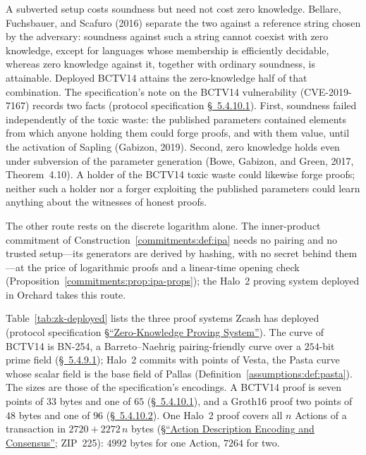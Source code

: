 \documentclass[11pt,a4paper]{article}
\theoremstyle{definition}
\theoremstyle{remark}
\begin{document}
A subverted setup costs soundness but need not cost zero knowledge.
Bellare, Fuchsbauer, and Scafuro (2016) separate the two against a
reference string chosen by the adversary: soundness against such a string
cannot coexist with zero knowledge, except for languages whose membership
is efficiently decidable, whereas zero knowledge against it, together with
ordinary soundness, is attainable. Deployed BCTV14 attains the
zero-knowledge half of that combination. The specification's note on
the BCTV14 vulnerability (CVE-2019-7167) records two facts (protocol
specification
\href{https://zips.z.cash/protocol/protocol.pdf\#bctv}{\S~5.4.10.1}).
First, soundness failed independently of the toxic waste: the
published parameters contained elements from which anyone holding
them could forge proofs, and with them value, until the activation of
Sapling (Gabizon, 2019). Second, zero knowledge holds even under
subversion of the parameter generation (Bowe, Gabizon, and Green,
2017, Theorem~4.10). A holder of the BCTV14 toxic waste could
likewise forge proofs; neither such a holder nor a forger exploiting
the published parameters could learn anything about the witnesses of
honest proofs.

The other route rests on the discrete logarithm alone. The
inner-product commitment of Construction~\ref{commitments:def:ipa}
needs no pairing and no trusted setup---its generators are derived by
hashing, with no secret behind them---at the price of logarithmic
proofs and a linear-time opening check
(Proposition~\ref{commitments:prop:ipa-props}); the Halo~2 proving
system deployed in Orchard takes this route.

Table~\ref{tab:zk-deployed} lists the three proof systems Zcash has
deployed (protocol specification
\href{https://zips.z.cash/protocol/protocol.pdf\#abstractzk}{\S``Zero-Knowledge
Proving System''}). The curve of BCTV14 is BN-254, a Barreto--Naehrig
pairing-friendly curve over a \(254\)-bit prime field
(\href{https://zips.z.cash/protocol/protocol.pdf\#bnpairing}{\S~5.4.9.1});
Halo~2 commits with points of Vesta, the Pasta curve whose scalar field
is the base field of Pallas (Definition~\ref{assumptions:def:pasta}).
The sizes are those of the specification's encodings. A BCTV14 proof is
seven points of \(33\) bytes and one of \(65\)
(\href{https://zips.z.cash/protocol/protocol.pdf\#bctvencoding}{\S~5.4.10.1}),
and a Groth16 proof two points of \(48\) bytes and one of \(96\)
(\href{https://zips.z.cash/protocol/protocol.pdf\#grothencoding}{\S~5.4.10.2}).
One Halo~2 proof covers all \(n\) Actions of a transaction in
\(2720 + 2272\,n\) bytes
(\href{https://zips.z.cash/protocol/protocol.pdf\#actionencodingandconsensus}{\S``Action
Description Encoding and Consensus''}; ZIP~225): \(4992\) bytes for one
Action, \(7264\) for two.
\end{document}
